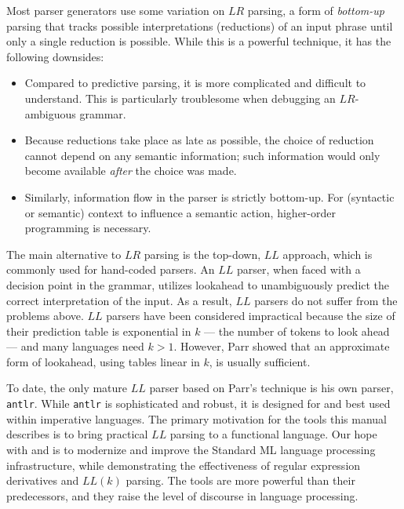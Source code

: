 Most parser generators use some variation on $LR$ parsing, a form of \emph{bottom-up} parsing that tracks possible interpretations (reductions) of an input phrase until only a single reduction is possible.  While this is a powerful technique, it has the following downsides:
\begin{itemize}
  \item Compared to predictive parsing, it is more complicated and difficult to understand.  This is particularly troublesome when debugging an $LR$-ambiguous grammar.
  \item Because reductions take place as late as possible, the choice of reduction cannot depend on any semantic information; such information would only become available \emph{after} the choice was made.
  \item Similarly, information flow in the parser is strictly bottom-up.  For (syntactic or semantic) context to influence a semantic action, higher-order programming is necessary.
\end{itemize} 
The main alternative to $LR$ parsing is the top-down, $LL$ approach, which is commonly used for hand-coded parsers.  An $LL$ parser, when faced with a decision point in the grammar, utilizes lookahead to unambiguously predict the correct interpretation of the input.  As a result, $LL$ parsers do not suffer from the problems above.  $LL$ parsers have been considered impractical because the size of their prediction table is exponential in $k$ --- the number of tokens to look ahead --- and many languages need $k > 1$.  However, Parr showed that an approximate form of lookahead, using tables linear in $k$, is usually sufficient.

To date, the only mature $LL$ parser based on Parr's technique is his own parser, {\tt antlr}.  While {\tt antlr} is sophisticated and robust, it is designed for and best used within imperative languages.  The primary motivation for the tools this manual describes is to bring practical $LL$ parsing to a functional language.
Our hope with \ulex{} and \mlantlr{} is to modernize and improve the Standard ML language processing infrastructure, while demonstrating the effectiveness of regular expression derivatives and $LL(k)$ parsing.  The tools are more powerful than their predecessors, and they raise the level of discourse in language processing.  


